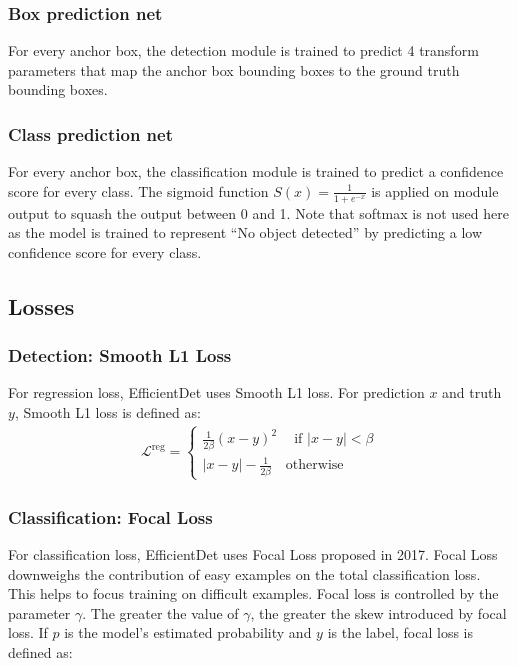 \documentclass[12pt,a4paper,twoside,openright]{report}
\newcommand{\regloss}{\mathcal{L}^\text{reg}}
\begin{document}
\subsubsection{Box prediction net}
For every anchor box, the detection module is trained to predict 4 transform parameters that map the anchor box bounding boxes to the ground truth bounding boxes. 

\subsubsection{Class prediction net}
For every anchor box, the classification module is trained to predict a confidence score for every class. The sigmoid function $S(x)=\frac{1}{1+e^{-x}}$ is applied on module output to squash the output between 0 and 1. Note that softmax is not used here as the model is trained to represent ``No object detected'' by predicting a low confidence score for every class.

\subsection{Losses}
\subsubsection{Detection: Smooth L1 Loss}
For regression loss, EfficientDet uses Smooth L1 loss. For prediction $x$ and truth $y$, Smooth L1 loss is defined as: 
\begin{align} \label{eq:smooth_l1}
    \regloss = \begin{cases}
        \frac{1}{2\beta}(x-y)^2\quad\ \text{if } |x-y| < \beta\\
        |x-y|-\frac{1}{2\beta}\quad \text{otherwise}
    \end{cases}
\end{align}

\subsubsection{Classification: Focal Loss}
For classification loss, EfficientDet uses Focal Loss \cite{lin_focal_2018} proposed in 2017. Focal Loss downweighs the contribution of easy examples on the total classification loss. This helps to focus training on difficult examples. Focal loss is controlled by the parameter $\gamma$. The greater the value of $\gamma$, the greater the skew introduced by focal loss. If $p$ is the model's estimated probability and $y$ is the label, focal loss is defined as:
\end{document}
